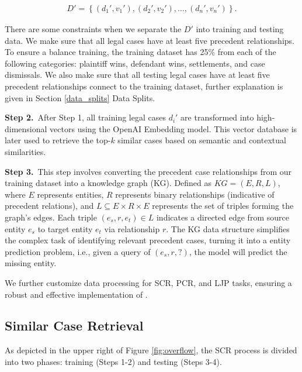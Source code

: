 \begin{equation}
\begin{aligned}
D' = \left\{ \left( d_1', v_1' \right), \left( d_2', v_2' \right), \ldots, \left( d_n', v_n' \right) \right\}.
\end{aligned}
\end{equation}

There are some constraints when we separate the \( D' \) into training and testing data. We make sure that all legal cases have at least five precedent relationships. To ensure a balance training, the training dataset has 25\% from each of the following categories: plaintiff wins, defendant wins, settlements, and case dismissals. We also make sure that all testing legal cases have at least five precedent relationships connect to the training dataset, further explanation is given in Section \ref{data_splits} Data Splits.

\vspace{3pt}\noindent\textbf{Step 2.}\, After Step 1, all training legal cases \( d_i' \) are transformed into high-dimensional vectors using the OpenAI Embedding model. This vector database is later used to retrieve the top-$k$ similar cases based on semantic and contextual similarities.

\vspace{3pt}\noindent\textbf{Step 3.}\, This step involves converting the precedent case relationships from our training dataset into a knowledge graph (KG). Defined as $KG = (E, R, L)$, where $E$ represents entities, $R$ represents binary relationships (indicative of precedent relations), and $L \subseteq E \times R \times E$ represents the set of triples forming the graph's edges. Each triple $(e_s, r, e_t) \in L$ indicates a directed edge from source entity $e_s$ to target entity $e_t$ via relationship $r$. The KG data structure simplifies the complex task of identifying relevant precedent cases, turning it into a entity prediction problem, i.e., given a query of $(e_s, r, ?)$, the model will predict the missing entity.

We further customize data processing for SCR, PCR, and LJP tasks, ensuring a robust and effective implementation of \sysname.

\subsection{Similar Case Retrieval}

As depicted in the upper right of Figure \ref{fig:overflow}, the SCR process is divided into two phases: training (Steps 1-2) and testing (Steps 3-4).


